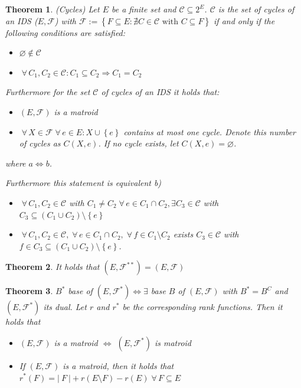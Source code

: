 \documentclass{article}
\newtheorem{theorem}{Theorem}
\newcommand{\card}[1]{\left|\:\!#1\:\!\right|}
\newcommand{\set}[1]{\left\{#1\right\}}
\newcommand{\fall}{\;\forall\,}
\begin{document}
\begin{theorem}
  \label{satz-8.8}
  (Cycles)
  Let $E$ be a finite set and $\mathcal{C} \subseteq 2^E$. $\mathcal{C}$ is the set of cycles of an IDS ($E, \mathcal{F}$) with $\mathcal{F} := \set{F \subseteq E: \nexists C \in \mathcal{C} \text{ with } C \subseteq F}$ if and only if the following conditions are satisfied:

  \begin{itemize}
    \item[(C1)] $\diameter \notin \mathcal{C}$
    \item[(C2)] $\fall C_1, C_2 \in \mathcal{C}: C_1 \subseteq C_2 \Rightarrow C_1 = C_2$
  \end{itemize}

  Furthermore for the set $\mathcal{C}$ of cycles of an IDS it holds that:
  \begin{itemize}
    \item[a)] $(E, \mathcal{F})$ is a matroid
    \item[b)] $\fall X \in \mathcal{F} \fall e \in E: X \cup \set{e}$ contains at most one cycle. Denote this number of cycles as $C(X, e)$. If no cycle exists, let $C(X, e) = \diameter$.
  \end{itemize}
  where $a \Leftrightarrow b$.

  Furthermore this statement is equivalent b)
  \begin{itemize}
    \item[(C3)] $\fall C_1, C_2 \in \mathcal{C}$ with $C_1 \neq C_2 \fall e \in C_1 \cap C_2, \exists C_3 \in \mathcal{C}$ with $C_3 \subseteq (C_1 \cup C_2) \setminus \set{e}$
    \item[(C4)] $\fall C_1, C_2 \in \mathcal{C}, \fall e \in C_1 \cap C_2, \fall f \in C_1 \setminus C_2$ exists $C_3 \in \mathcal{C}$ with $f \in C_3 \subseteq (C_1 \cup C_2) \setminus \set{e}$.
  \end{itemize}
\end{theorem}
\begin{theorem}
  \label{proposition-8.9}
  It holds that $(E, \mathcal{F}^{**}) = (E, \mathcal{F})$
\end{theorem}
\begin{theorem}
  \label{corollary-8.10}
  \label{satz-8.10}
  $B^*$ base of $(E, \mathcal{F}^*) \Leftrightarrow \exists$ base $B$ of $(E, \mathcal{F})$ with $B^* = B^C$ and $(E, \mathcal{F}^*)$ its dual. Let $r$ and $r^*$ be the corresponding rank functions.
  Then it holds that
  \begin{itemize}
    \item[a)] $(E, \mathcal{F})$ is a matroid $\Leftrightarrow$ $(E, \mathcal{F}^*)$ is matroid
    \item[b)] If $(E, \mathcal{F})$ is a matroid, then it holds that $r^*(F) = \card{F} + r(E \setminus F) - r(E) \fall F \subseteq E$
  \end{itemize}
\end{theorem}
\end{document}
